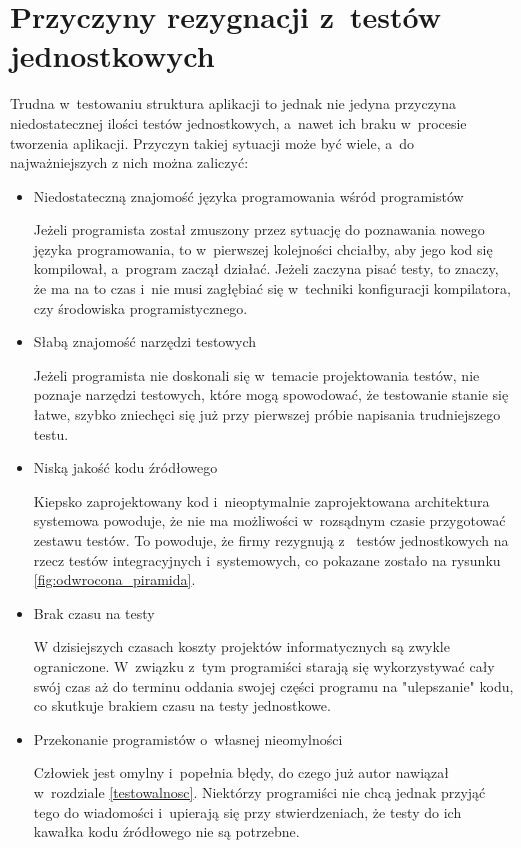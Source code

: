 \section{Przyczyny rezygnacji z~testów jednostkowych}
\label{testy_jednostkowe_brak}
Trudna w~testowaniu struktura aplikacji to jednak nie jedyna przyczyna niedostatecznej ilości testów jednostkowych, a~nawet ich braku w~procesie tworzenia aplikacji. Przyczyn takiej sytuacji może być wiele, a~do najważniejszych z nich można zaliczyć:
\begin{itemize}
\item
Niedostateczną znajomość języka programowania wśród programistów

Jeżeli programista został zmuszony przez sytuację do poznawania nowego języka programowania, to w~pierwszej kolejności chciałby, aby jego kod się kompilował, a~program zaczął działać. Jeżeli zaczyna pisać testy, to znaczy, że ma na to czas i~nie musi zagłębiać się w~techniki konfiguracji kompilatora, czy środowiska programistycznego. 

\item
Słabą znajomość narzędzi testowych

Jeżeli programista nie doskonali się w~temacie projektowania testów, nie poznaje narzędzi testowych, które mogą spowodować, że testowanie stanie się łatwe, szybko zniechęci się już przy pierwszej próbie napisania trudniejszego testu.

\item
Niską jakość kodu źródłowego

Kiepsko zaprojektowany kod i~nieoptymalnie zaprojektowana architektura systemowa powoduje, że nie ma możliwości w~rozsądnym czasie przygotować zestawu testów. To powoduje, że firmy rezygnują z~ testów jednostkowych na rzecz testów integracyjnych i~systemowych, co pokazane zostało na rysunku \ref{fig:odwrocona_piramida}.

\item
Brak czasu na testy

W dzisiejszych czasach koszty projektów informatycznych są zwykle ograniczone. W~związku z~tym programiści starają się wykorzystywać cały swój czas aż do terminu oddania swojej części programu na "ulepszanie" kodu, co skutkuje brakiem czasu na testy jednostkowe.

\item
Przekonanie programistów o~własnej nieomylności

Człowiek jest omylny i~popełnia błędy, do czego już autor nawiązał w~rozdziale \ref{testowalnosc}. Niektórzy programiści nie chcą jednak przyjąć tego do wiadomości i~upierają się przy stwierdzeniach, że testy do ich kawałka kodu źródłowego nie są potrzebne.
\end{itemize}

